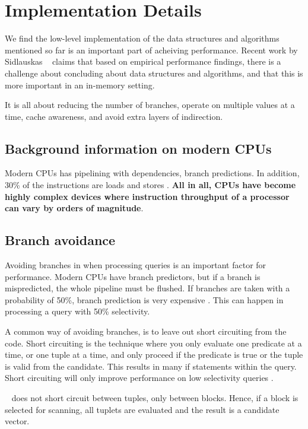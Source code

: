\chapter{Implementation Details}
\label{chap:Implementation Details}
We find the low-level implementation of the data structures and algorithms mentioned so far is an important part of acheiving performance. Recent work by Sidlauskas \ea~\cite{Sidlauskas2014-ef} claims that based on empirical performance findings, there is a challenge about concluding about data structures and algorithms, and that this is more important in an in-memory setting.

It is all about reducing the number of branches, operate on multiple values at a time, cache awareness, and avoid extra layers of indirection.
\newpage

\section{Background information on modern CPUs}
\label{sec:Background information on modern CPUs}
Modern CPUs has pipelining with dependencies, branch predictions. In addition, 30\% of the instructions are loads and stores \cite{Boncz2005-wj}. \textbf{All in all, CPUs have become highly complex devices where instruction throughput of a processor can vary by orders of magnitude}. 

\section{Branch avoidance}
\label{sec:Branch avoidance}
Avoiding branches in when processing queries is an important factor for performance. Modern CPUs have branch predictors, but if a branch is mispredicted, the whole pipeline must be flushed. If branches are taken with a probability of 50\%, branch prediction is very expensive \cite{Neumann2011-uq}. This can happen in processing a query with 50\% selectivity. 

A common way of avoiding branches, is to leave out short circuiting from the code. Short circuiting is the technique where you only evaluate one predicate at a time, or one tuple at a time, and only proceed if the predicate is true or the tuple is valid from the candidate. This results in many if statements within the query. Short circuiting will only improve performance on low selectivity queries \cite{Johnson2008-cp}.

\blink~\cite{Johnson2008-cp} does not short circuit between tuples, only between blocks. Hence, if a block is selected for scanning, all tuplets are evaluated and the result is a candidate vector.

